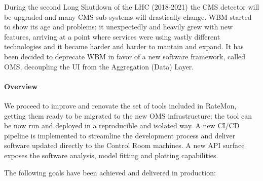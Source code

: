 \documentclass[a4, oneside, 10pt, nobib]{memoir}
\begin{document}
		During the second Long Shutdown of the LHC (2018-2021) the CMS detector will be upgraded and many CMS sub-systems will drastically change. WBM started to show its age and problems: it unexpectedly and heavily grew with new features, arriving at a point where services were using vastly different technologies and it became harder and harder to mantain and expand. It has been decided to deprecate WBM in favor of a new software framework, called OMS, decoupling the UI from the Aggregation (Data) Layer.

		\paragraph{Overview}

		We proceed to improve and renovate the set of tools included in RateMon, getting them ready to be migrated to the new OMS infrastructure: the tool can be now run and deployed in a reproducible and isolated way. A new CI/CD pipeline is implemented to streamline the development process and deliver software updated directly to the Control Room machines. A new API surface exposes the software analysis, model fitting and plotting capabilities.

		The following goals have been achieved and delivered in production:
\end{document}
